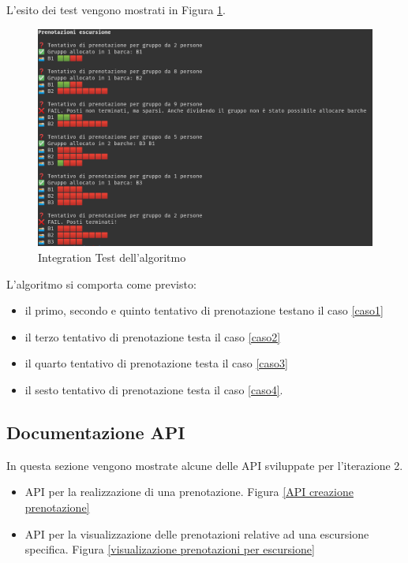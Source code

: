 L'esito dei test vengono mostrati in Figura \ref{Integration Test dell'algoritmo}.

\begin{figure}[htbp]
    \includegraphics[width=\textwidth]{images/iterazione1/test/integration-test/bookings.png}
    \centering
    \caption{Integration Test dell'algoritmo}
    \label{Integration Test dell'algoritmo}
\end{figure}

\clearpage

L'algoritmo si comporta come previsto:
\begin{itemize}
    \item il primo, secondo e quinto tentativo di prenotazione testano il caso \ref{caso1}
    \item il terzo tentativo di prenotazione testa il caso \ref{caso2}
    \item il quarto tentativo di prenotazione testa il caso \ref{caso3}
    \item il sesto tentativo di prenotazione testa il caso \ref{caso4}.
\end{itemize}

\cleardoublepage 
\subsection{Documentazione API}
In questa sezione vengono mostrate alcune delle API sviluppate per l'iterazione 2.  
\begin{itemize}
    \item API per la realizzazione di una prenotazione. Figura \ref{API creazione prenotazione}
    \item API per la visualizzazione delle prenotazioni relative ad una escursione specifica. Figura \ref{visualizazione prenotazioni per escursione}
\end{itemize}

